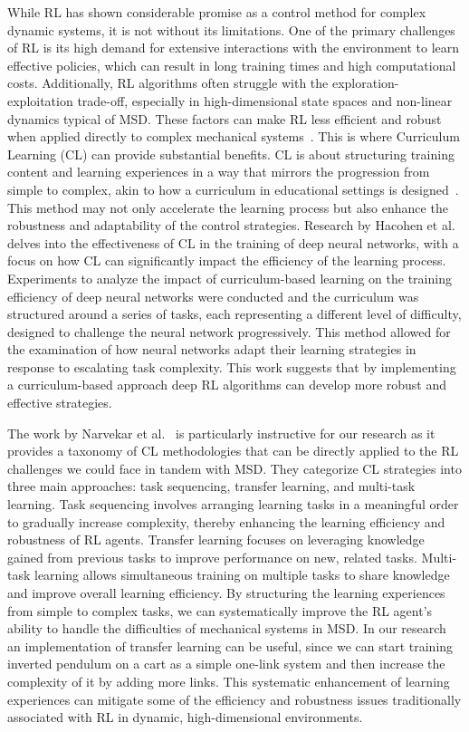 While RL has shown considerable promise as a control method for complex dynamic systems, it is not without its limitations. One of the primary challenges of RL is its high demand for extensive interactions with the environment to learn effective policies, which can result in long training times and high computational costs. Additionally, RL algorithms often struggle with the exploration-exploitation trade-off, especially in high-dimensional state spaces and non-linear dynamics typical of MSD. These factors can make RL less efficient and robust when applied directly to complex mechanical systems~\cite{dulac2019challenges}.
This is where Curriculum Learning (CL) can provide substantial benefits. CL is about structuring training content and learning experiences in a way that mirrors the progression from simple to complex, akin to how a curriculum in educational settings is designed~\cite{bengio2009cl}. This method may not only accelerate the learning process but also enhance the robustness and adaptability of the control strategies.
Research by Hacohen et al.~\cite{hacohen2019clnetworks} delves into the effectiveness of CL in the training of deep neural networks, with a focus on how CL can significantly impact the efficiency of the learning process. Experiments to analyze the impact of curriculum-based learning on the training efficiency of deep neural networks were conducted and the curriculum was structured around a series of tasks, each representing a different level of difficulty, designed to challenge the neural network progressively. This method allowed for the examination of how neural networks adapt their learning strategies in response to escalating task complexity. This work suggests that by implementing a curriculum-based approach deep RL algorithms can develop more robust and effective strategies.


The work by Narvekar et al.~\cite{narvekar2020survey} is particularly instructive for our research as it provides a taxonomy of CL methodologies that can be directly applied to the RL challenges we could face in tandem with MSD. They categorize CL strategies into three main approaches: task sequencing, transfer learning, and multi-task learning. Task sequencing involves arranging learning tasks in a meaningful order to gradually increase complexity, thereby enhancing the learning efficiency and robustness of RL agents. Transfer learning focuses on leveraging knowledge gained from previous tasks to improve performance on new, related tasks. Multi-task learning allows simultaneous training on multiple tasks to share knowledge and improve overall learning efficiency. By structuring the learning experiences from simple to complex tasks, we can systematically improve the RL agent's ability to handle the difficulties of mechanical systems in MSD. In our research an implementation of transfer learning can be useful, since we can start training inverted pendulum on a cart as a simple one-link system and then increase the complexity of it by adding more links. This systematic enhancement of learning experiences can mitigate some of the efficiency and robustness issues traditionally associated with RL in dynamic, high-dimensional environments.

